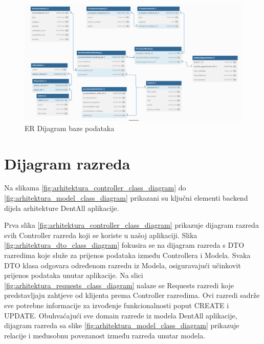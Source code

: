 				\begin{figure}[H]
					\includegraphics[scale=0.32]{slike/dijagram_baze.png} %
					\centering
					\caption{ER Dijagram baze podataka}
					\label{fig:dijagram_baze_podataka}
				\end{figure}
			
			\eject
			
			
		\section{Dijagram razreda}
		
			Na slikama \ref{fig:arhitektura_controller_class_diagram}  do \ref{fig:arhitektura_model_class_diagram}  prikazani su ključni elementi backend dijela arhitekture DentAll aplikacije. 
			
			Prva slika \ref{fig:arhitektura_controller_class_diagram}  prikazuje dijagram razreda svih Controller razreda koji se koriste u našoj aplikaciji.  Slika \ref{fig:arhitektura_dto_class_diagram} fokusira se na dijagram razreda s DTO razredima koje služe za prijenos podataka između Controllera i Modela. Svaka DTO klasa odgovara određenom razredu iz Modela, osiguravajući učinkovit prijenos podataka unutar aplikacije. Na slici \ref{fig:arhitektura_requests_class_diagram} nalaze se Requests razredi koje predstavljaju zahtjeve od klijenta prema Controller razredima. Ovi razredi sadrže sve potrebne informacije za izvođenje funkcionalnosti poput CREATE i UPDATE. Obuhvaćajući sve domain razrede iz modela DentAll aplikacije, dijagram razreda sa slike  \ref{fig:arhitektura_model_class_diagram} prikazuje relacije i međusobnu povezanost između razreda unutar modela. 
			
